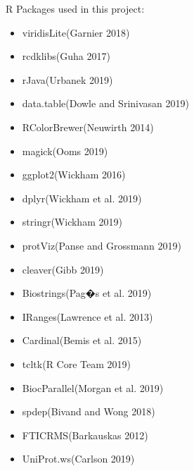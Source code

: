 \documentclass[
]{article}
\begin{document}
R Packages used in this project:

\begin{itemize}
\item
  viridisLite(Garnier 2018)
\item
  rcdklibs(Guha 2017)
\item
  rJava(Urbanek 2019)
\item
  data.table(Dowle and Srinivasan 2019)
\item
  RColorBrewer(Neuwirth 2014)
\item
  magick(Ooms 2019)
\item
  ggplot2(Wickham 2016)
\item
  dplyr(Wickham et al. 2019)
\item
  stringr(Wickham 2019)
\item
  protViz(Panse and Grossmann 2019)
\item
  cleaver(Gibb 2019)
\item
  Biostrings(Pag�s et al. 2019)
\item
  IRanges(Lawrence et al. 2013)
\item
  Cardinal(Bemis et al. 2015)
\item
  tcltk(R Core Team 2019)
\item
  BiocParallel(Morgan et al. 2019)
\item
  spdep(Bivand and Wong 2018)
\item
  FTICRMS(Barkauskas 2012)
\item
  UniProt.ws(Carlson 2019)
\end{itemize}
\end{document}
